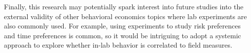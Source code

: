 \documentclass[12pt]{article}
\begin{document}
Finally, this research may potentially spark interest into future studies into the external validity of other behavioral economics topics where lab experiments are also commonly used. For example, using experiments to study risk preferences and time preferences is common, so it would be intriguing to adopt a systemic approach to explore whether in-lab behavior is correlated to field measures.



\newpage




%

%
%
%
%
%
%
%
%
%
%
%
\end{document}
